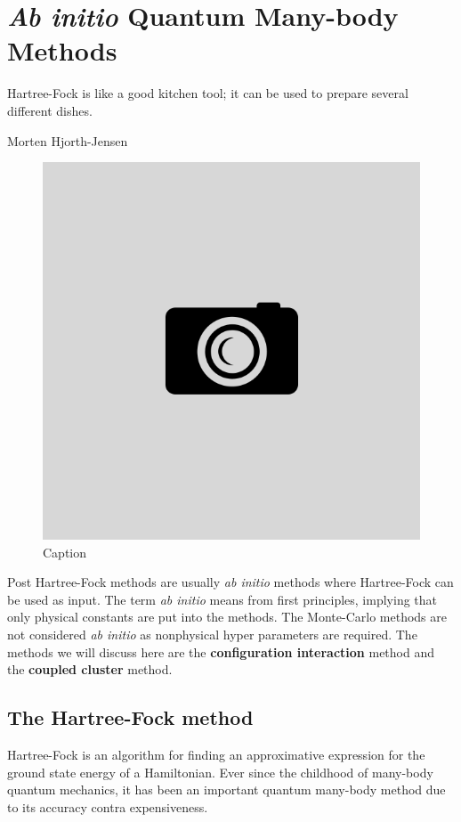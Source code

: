 \chapter{\textit{Ab initio} Quantum Many-body Methods} \label{chp:othermethods}
\epigraph{Hartree-Fock is like a good kitchen tool; it can be used to prepare several different dishes.}{Morten Hjorth-Jensen}
\begin{figure}[H]
	\centering
	\includegraphics[scale=0.4]{Images/example.png}
	\caption{Caption}
\end{figure}

Post Hartree-Fock methods are usually \textit{ab initio} methods where Hartree-Fock can be used as input. The term \textit{ab initio} means from first principles, implying that only physical constants are put into the methods. The Monte-Carlo methods are not considered \textit{ab initio} as nonphysical hyper parameters are required. The methods we will discuss here are the \textbf{configuration interaction} method and the \textbf{coupled cluster} method. \newpage

\section{The Hartree-Fock method}
Hartree-Fock is an algorithm for finding an approximative expression for the ground state energy of a Hamiltonian. Ever since the childhood of many-body quantum mechanics, it has been an important quantum many-body method due to its accuracy contra expensiveness. 

